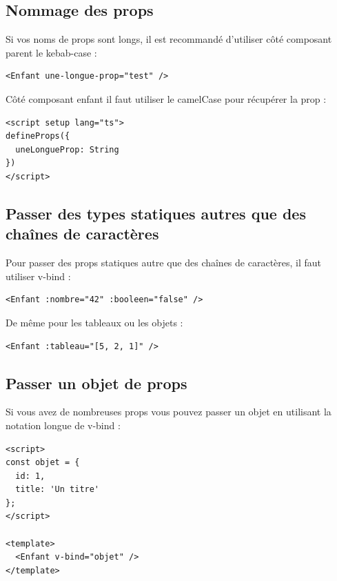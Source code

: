 \subsection{Nommage des {\color{monOrange}props}}
Si vos noms de {\color{monOrange}props} sont longs, il est recommandé d'utiliser côté composant parent le {\color{monOrange}kebab-case} :
\begin{verbatim}
<Enfant une-longue-prop="test" />
\end{verbatim}
Côté composant enfant il faut utiliser le {\color{monOrange}camelCase} pour récupérer la {\color{monOrange}prop} :
\begin{verbatim}
<script setup lang="ts">
defineProps({
  uneLongueProp: String
})
</script>
\end{verbatim}

\subsection{Passer des types statiques autres que des chaînes de caractères}
Pour passer des {\color{monOrange}props} statiques autre que des chaînes de caractères, il faut utiliser {\color{monOrange}v-bind} :
\begin{verbatim}
<Enfant :nombre="42" :booleen="false" />
\end{verbatim}
De même pour les tableaux ou les objets :
\begin{verbatim}
<Enfant :tableau="[5, 2, 1]" />
\end{verbatim}

\subsection{Passer un objet de {\color{monOrange}props}}
Si vous avez de nombreuses {\color{monOrange}props} vous pouvez passer un objet en utilisant la notation longue de {\color{monOrange}v-bind} :
\begin{verbatim}
<script>
const objet = {
  id: 1,
  title: 'Un titre'
};
</script>

<template>
  <Enfant v-bind="objet" />
</template>
\end{verbatim}

